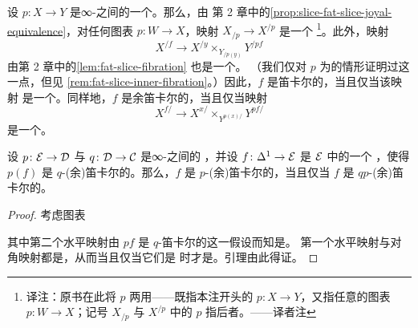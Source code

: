 \begin{remark}\label{rem:cartesian-slices}
设 $p\colon X \to Y$ 是∞-\trCategories{}之间的一个\trInnerFibration{}。那么，由
第 2 章中的\cref{prop:slice-fat-slice-joyal-equivalence}，对任何图表
$p\colon W \to X$，映射 $X_{/p} \to X^{/p}$ 是一个\trJoyalEquivalence{}%
\footnote{译注：原书在此将 $p$ 两用——既指本注开头的\trInnerFibration{}%
$p\colon X \to Y$，又指任意的图表 $p\colon W \to X$；记号 $X_{/p}$ 与
$X^{/p}$ 中的 $p$ 指后者。——译者注}。此外，映射
\[
X^{/f} \longrightarrow X^{/y} \times_{Y_{/p(y)}} Y^{/pf}
\]
由第 2 章中的\cref{lem:fat-slice-fibration} 也是一个\trRightFibration{}。
（我们仅对 $p$ 为\trIsofibration{}的情形证明过这一点，但见
\cref{rem:fat-slice-inner-fibration}。）因此，$f$ 是笛卡尔的，当且仅当该映射
是一个\trTrivialFibration{}。同样地，$f$ 是余笛卡尔的，当且仅当映射
\[
X^{f/} \longrightarrow X^{x/} \times_{Y^{p(x)/}} Y^{pf/}
\]
是一个\trTrivialFibration{}。
\end{remark}

\begin{lemma}\label{lem:cartesian-composition}
设 $p\colon \mathcal{E} \to \mathcal{D}$ 与 $q\colon \mathcal{D} \to \mathcal{C}$ 是∞-\trCategories{}之间的%
\trInnerFibration{}，并设 $f\colon \Delta^1 \to \mathcal{E}$ 是 $\mathcal{E}$ 中的一个%
\trMorphism{}，使得 $p(f)$ 是 $q$-(余)笛卡尔的。那么，$f$ 是
$p$-(余)笛卡尔的，当且仅当 $f$ 是 $qp$-(余)笛卡尔的。
\end{lemma}

\begin{proof}
考虑图表
\begin{center}
\end{center}
其中第二个水平映射由 $pf$ 是 $q$-笛卡尔的这一假设而知是\trTrivialFibration{}。
第一个水平映射与对角映射都是\trRightFibration{}，从而当且仅当它们是%
\trJoyalEquivalence{}时才是\trTrivialFibration{}。引理由此得证。
\end{proof}

